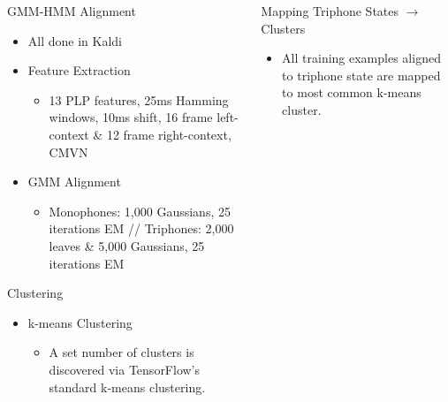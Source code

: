 \documentclass[final]{beamer} %
\newlength{\columnheight}
\begin{document}
\begin{frame}
\begin{columns}
\begin{column}{0.3\textwidth}
{        \vfill

        
        \begin{block}{\boxnumber GMM-HMM Alignment}
          \begin{itemize}
            \item All done in Kaldi
          \item Feature Extraction
            \begin{itemize}
            \item 13 PLP features, 25ms Hamming windows, 10ms shift, 16 frame left-context \& 12 frame right-context, CMVN
            \end{itemize}
          \item GMM Alignment
            \begin{itemize}
            \item Monophones: 1,000 Gaussians, 25 iterations EM // Triphones: 2,000 leaves \& 5,000 Gaussians, 25 iterations EM
            \end{itemize}
          \end{itemize}
        \end{block}
  
        \vfill


                \begin{block}{\boxnumber Clustering}            
          \begin{itemize}
          \item k-means Clustering
            \begin{itemize}
            \item A set number of clusters is discovered via TensorFlow's standard k-means clustering.
            \end{itemize}
          \end{itemize}
        \end{block}

                
      } %
    \end{column}

    \begin{column}{0.3\textwidth}

      \parbox[t][\columnheight]{.9\textwidth}{
        
        \vspace{.4cm}

                
                \begin{block}{\boxnumber Mapping Triphone States $\rightarrow$ Clusters}          
          \begin{itemize}
            \item All training examples aligned to triphone state are mapped to most common k-means cluster.
          \end{itemize}
                \end{block}

}
\end{column}
\end{columns}
\end{frame}
\end{document}
